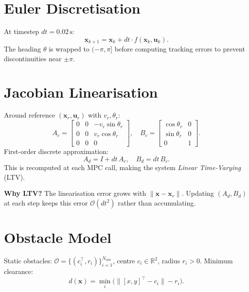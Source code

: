 \documentclass[12pt,a4paper,oneside]{report}
\begin{document}
\section{Euler Discretisation}

At timestep \(dt=0.02\,\text{s}\):
\begin{equation}
  \mathbf{x}_{k+1} = \mathbf{x}_k + dt\cdot f(\mathbf{x}_k,\mathbf{u}_k).
\end{equation}
The heading \(\theta\) is wrapped to \((-\pi,\pi]\) before computing
tracking errors to prevent discontinuities near \(\pm\pi\).

\section{Jacobian Linearisation}

Around reference \((\mathbf{x}_r,\mathbf{u}_r)\) with \(v_r,\theta_r\):
\begin{equation}
  A_c = \begin{bmatrix}0&0&-v_r\sin\theta_r\\0&0&v_r\cos\theta_r\\0&0&0\end{bmatrix},\quad
  B_c = \begin{bmatrix}\cos\theta_r&0\\\sin\theta_r&0\\0&1\end{bmatrix}.
\end{equation}
First-order discrete approximation:
\begin{equation}
  A_d = I + dt\,A_c,\quad B_d = dt\,B_c.
\end{equation}
This is recomputed at each MPC call, making the system
\textit{Linear Time-Varying} (LTV).

\begin{notebox}
  \textbf{Why LTV?} The linearisation error grows with
  \(\|\mathbf{x}-\mathbf{x}_r\|\). Updating \((A_d,B_d)\) at each step
  keeps this error \(\mathcal{O}(dt^2)\) rather than accumulating.
\end{notebox}

\section{Obstacle Model}

Static obstacles: \(\mathcal{O} = \{(c_i^\top, r_i)\}_{i=1}^{N_{\mathrm{obs}}}\),
centre \(c_i\in\mathbb{R}^2\), radius \(r_i>0\). Minimum clearance:
\begin{equation}
  d(\mathbf{x}) = \min_i\bigl(\|[x,y]^\top - c_i\| - r_i\bigr).
\end{equation}
\end{document}
